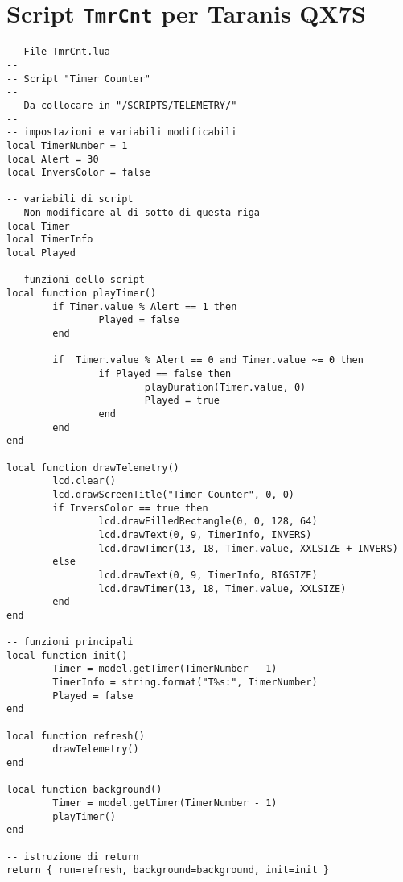 \section*{Script \texttt{TmrCnt} per Taranis QX7S}
\begin{lstlisting}
-- File TmrCnt.lua
--
-- Script "Timer Counter"
--
-- Da collocare in "/SCRIPTS/TELEMETRY/"
--
-- impostazioni e variabili modificabili 
local TimerNumber = 1
local Alert = 30                
local InversColor = false

-- variabili di script 
-- Non modificare al di sotto di questa riga
local Timer
local TimerInfo
local Played 

-- funzioni dello script 
local function playTimer()
        if Timer.value % Alert == 1 then
                Played = false
        end

        if  Timer.value % Alert == 0 and Timer.value ~= 0 then
                if Played == false then
                        playDuration(Timer.value, 0)
                        Played = true
                end
        end
end 

local function drawTelemetry()
        lcd.clear() 
        lcd.drawScreenTitle("Timer Counter", 0, 0)
        if InversColor == true then
                lcd.drawFilledRectangle(0, 0, 128, 64)
                lcd.drawText(0, 9, TimerInfo, INVERS)
                lcd.drawTimer(13, 18, Timer.value, XXLSIZE + INVERS)
        else
                lcd.drawText(0, 9, TimerInfo, BIGSIZE)
                lcd.drawTimer(13, 18, Timer.value, XXLSIZE)
        end
end

-- funzioni principali 
local function init()
        Timer = model.getTimer(TimerNumber - 1)
        TimerInfo = string.format("T%s:", TimerNumber)
        Played = false
end

local function refresh()
        drawTelemetry()
end

local function background()
        Timer = model.getTimer(TimerNumber - 1)
        playTimer()
end

-- istruzione di return 
return { run=refresh, background=background, init=init }
\end{lstlisting}

\clearpage


